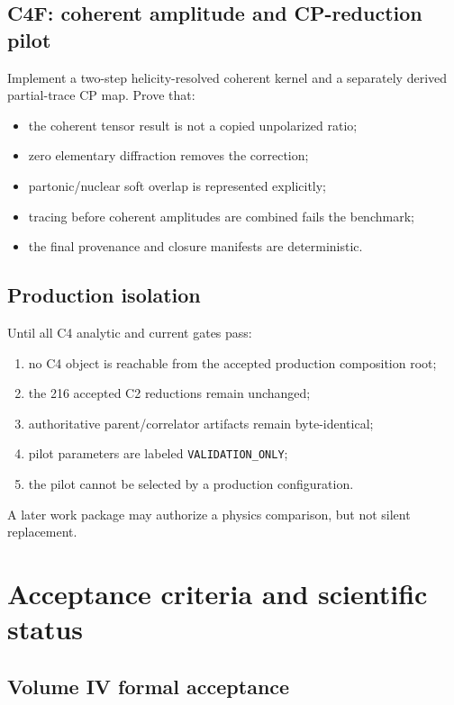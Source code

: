 \documentclass[11pt]{article}
\begin{document}
\subsection{C4F: coherent amplitude and CP-reduction pilot}

Implement a two-step helicity-resolved coherent kernel and a separately
derived partial-trace CP map.  Prove that:
\begin{itemize}
\item the coherent tensor result is not a copied unpolarized ratio;
\item zero elementary diffraction removes the correction;
\item partonic/nuclear soft overlap is represented explicitly;
\item tracing before coherent amplitudes are combined fails the benchmark;
\item the final provenance and closure manifests are deterministic.
\end{itemize}

\subsection{Production isolation}

Until all C4 analytic and current gates pass:
\begin{enumerate}
\item no C4 object is reachable from the accepted production composition
      root;
\item the 216 accepted C2 reductions remain unchanged;
\item authoritative parent/correlator artifacts remain byte-identical;
\item pilot parameters are labeled \texttt{VALIDATION\_ONLY};
\item the pilot cannot be selected by a production configuration.
\end{enumerate}
A later work package may authorize a physics comparison, but not silent
replacement.

\section{Acceptance criteria and scientific status}
\label{sec:acceptance}

\subsection{Volume IV formal acceptance}
\end{document}
